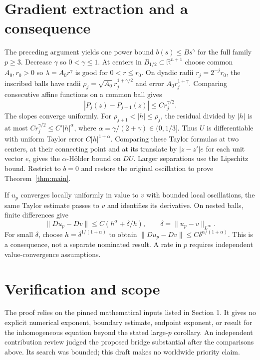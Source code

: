\documentclass[11pt]{article}
\theoremstyle{remark}\newtheorem{remark}[theorem]{Remark}
\newcommand{\R}{\mathbb R}
\begin{document}



\section{Gradient extraction and a consequence}

The preceding argument yields one power bound $b(s)\leq Bs^\gamma$
for the full family $p\geq3$. Decrease $\gamma$ so $0<\gamma\leq1$.
At centers in $B_{1/2}\subset\R^{n+1}$ choose common $A_0,r_0>0$
so $\lambda=A_0r^\gamma$ is good for $0<r\leq r_0$.
On dyadic radii $r_j=2^{-j}r_0$, the inscribed balls have radii
$\rho_j=\sqrt{A_0}r_j^{1+\gamma/2}$ and error
$A_0r_j^{1+\gamma}$. Comparing consecutive affine functions on a
common ball gives
\[
 |P_j(z)-P_{j+1}(z)|\leq Cr_j^{\gamma/2}.
\]
The slopes converge uniformly. For
$\rho_{j+1}<|h|\leq\rho_j$, the residual divided by $|h|$ is at most
$Cr_j^{\gamma/2}\leq C'|h|^\alpha$, where
$\alpha=\gamma/(2+\gamma)\in(0,1/3]$.
Thus $U$ is differentiable with uniform Taylor error
$C|h|^{1+\alpha}$. Comparing these Taylor formulas at two centers,
at their connecting point and at its translate by $|z-z'|e$ for each
unit vector $e$, gives the $\alpha$-Hölder bound on $DU$. Larger
separations use the Lipschitz bound. Restrict to $b=0$ and restore
the original oscillation to prove Theorem~\ref{thm:main}.

If $u_p$ converges locally uniformly in value to $v$ with bounded
local oscillations, the same Taylor estimate passes to $v$ and
identifies its derivative. On nested balls, finite differences give
\[
 \|Du_p-Dv\|\leq C(h^\alpha+\delta/h),
 \qquad\delta=\|u_p-v\|_{L^\infty}.
\]
For small $\delta$, choose $h=\delta^{1/(1+\alpha)}$ to obtain
$\|Du_p-Dv\|\leq C\delta^{\alpha/(1+\alpha)}$. This is a
consequence, not a separate nominated result. A rate in $p$ requires
independent value-convergence assumptions.

\section{Verification and scope}

The proof relies on the pinned mathematical inputs listed in Section 1.
It gives no explicit numerical exponent, boundary estimate, endpoint
exponent, or result for the inhomogeneous equation beyond the stated
large-$p$ corollary. An independent contribution review judged the
proposed bridge substantial after the comparisons above. Its search
was bounded; this draft makes no worldwide priority claim.
\end{document}
